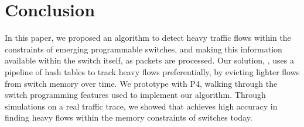 \section{Conclusion}\label{sec:conclusion}


In this paper, we proposed an algorithm to detect heavy traffic flows within the
constraints of emerging programmable switches, and making this information
available within the switch itself, as packets are processed. Our solution,
\TheSystem, uses a pipeline of hash tables to track heavy flows preferentially,
by evicting lighter flows from switch memory over time. We prototype \TheSystem
with P4, walking through the switch programming features used to implement our
algorithm. Through simulations on a real traffic trace, we showed that
\TheSystem achieves high accuracy in finding heavy flows within the memory
constraints of switches today.%


